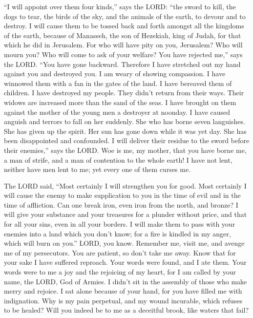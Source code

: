  ``I will appoint over them four kinds,'' says the LORD:
``the sword to kill, the dogs to tear, the birds of the sky, and the
animals of the earth, to devour and to destroy.  I will
cause them to be tossed back and forth amongst all the kingdoms of the
earth, because of Manasseh, the son of Hezekiah, king of Judah, for that
which he did in Jerusalem.  For who will have pity on you,
Jerusalem? Who will mourn you? Who will come to ask of your welfare?
 You have rejected me,'' says the LORD. ``You have gone
backward. Therefore I have stretched out my hand against you and
destroyed you. I am weary of showing compassion.  I have
winnowed them with a fan in the gates of the land. I have bereaved them
of children. I have destroyed my people. They didn't return from their
ways.  Their widows are increased more than the sand of the
seas. I have brought on them against the mother of the young men a
destroyer at noonday. I have caused anguish and terrors to fall on her
suddenly.  She who has borne seven languishes. She has given
up the spirit. Her sun has gone down while it was yet day. She has been
disappointed and confounded. I will deliver their residue to the sword
before their enemies,'' says the LORD.  Woe is me, my
mother, that you have borne me, a man of strife, and a man of contention
to the whole earth! I have not lent, neither have men lent to me; yet
every one of them curses me.

 The LORD said, ``Most certainly I will strengthen you for
good. Most certainly I will cause the enemy to make supplication to you
in the time of evil and in the time of affliction.  Can one
break iron, even iron from the north, and bronze?  I will
give your substance and your treasures for a plunder without price, and
that for all your sins, even in all your borders.  I will
make them to pass with your enemies into a land which you don't know;
for a fire is kindled in my anger, which will burn on you.''
 LORD, you know. Remember me, visit me, and avenge me of my
persecutors. You are patient, so don't take me away. Know that for your
sake I have suffered reproach.  Your words were found, and
I ate them. Your words were to me a joy and the rejoicing of my heart,
for I am called by your name, the LORD, God of Armies.  I
didn't sit in the assembly of those who make merry and rejoice. I sat
alone because of your hand, for you have filled me with indignation.
 Why is my pain perpetual, and my wound incurable, which
refuses to be healed? Will you indeed be to me as a deceitful brook,
like waters that fail?

